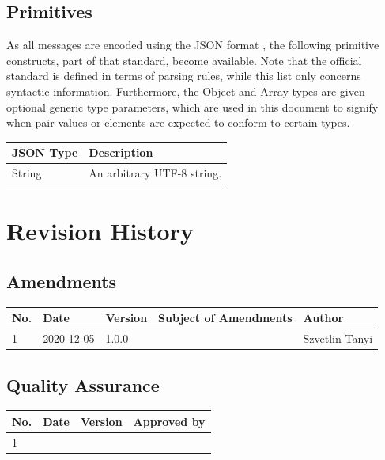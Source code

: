\documentclass[a4paper]{arrowhead}
\newcommand{\pdef}[1]{{\textcolor{ArrowheadGrey}{#1 \label{sec:model:primitives:#1} \label{sec:model:primitives:#1s}}}}
\newcommand{\pref}[1]{{\textcolor{ArrowheadGrey}{\hyperref[sec:model:primitives:#1]{#1}}}}
\begin{document}
\subsection{Primitives}
\label{sec:model:primitives}

As all messages are encoded using the JSON format \cite{bray2014json}, the following primitive constructs, part of that standard, become available.
Note that the official standard is defined in terms of parsing rules, while this list only concerns syntactic information.
Furthermore, the \pref{Object} and \pref{Array} types are given optional generic type parameters, which are used in this document to signify when pair values or elements are expected to conform to certain types. 

\begin{table}[ht!]
\begin{tabularx}{\textwidth}{| p{3cm} | X |} \hline
\rowcolor{gray!33} JSON Type & Description \\ \hline
\pdef{String}                & An arbitrary UTF-8 string. \\ \hline
\end{tabularx}
\end{table}

\newpage




\newpage

\section{Revision History}
\subsection{Amendments}

\noindent\begin{tabularx}{\textwidth}{| p{1cm} | p{3cm} | p{2cm} | X | p{4cm} |} \hline
\rowcolor{gray!33} No. & Date & Version & Subject of Amendments & Author \\ \hline

1 & 2020-12-05 & 1.0.0 & & Szvetlin Tanyi \\ \hline

\end{tabularx}

\subsection{Quality Assurance}

\noindent\begin{tabularx}{\textwidth}{| p{1cm} | p{3cm} | p{2cm} | X |} \hline
\rowcolor{gray!33} No. & Date & Version & Approved by \\ \hline

1 &  &  & \\ \hline

\end{tabularx}
\end{document}
